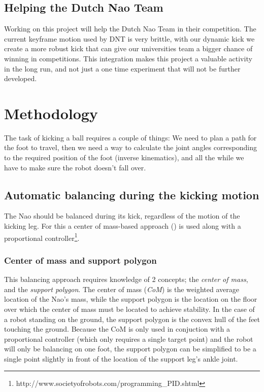 \documentclass[a4paper]{article}
\begin{document}
\subsection{Helping the Dutch Nao Team}
 Working on this project will help the Dutch Nao Team in their competition. The
current keyframe motion used by DNT is very brittle, with our dynamic kick we
create a
more robust kick that can give our universities team a bigger chance of
winning in competitions. 
This integration makes this project a valuable activity in the long run, and not
just a one time experiment that will not be further developed.

\section{Methodology}
The task of kicking a ball requires a couple of things: We need to plan a path
for the foot to travel, then we need a way to calculate the joint angles
corresponding to the required position of the foot (inverse kinematics), and all
the while we have to make sure the robot doesn't fall over.

\subsection{Automatic balancing during the kicking motion}
The Nao should be balanced during its kick, regardless of the motion of the
kicking leg. For this a center of mass-based approach (\cite{Xu2010}) is used
along with a proportional
controller\footnote{http://www.societyofrobots.com/programming\_PID.shtml}.

\subsubsection{Center of mass and support polygon}
This balancing approach requires knowledge of 2 concepts; the \emph{center of mass},
and the \emph{support polygon}. The center of mass (\emph{CoM}) is the weighted average
location of the Nao’s mass, while the support polygon is the location on the
floor over which the center of mass must be located to achieve stability. In the
case of a robot standing on the ground, the support polygon is the convex hull
of the feet touching the ground. Because the CoM is only used in conjuction with
a proportional controller (which only requires a single target point) and the
robot will only be balancing on one foot, the support polygon can be simplified
to be a single point slightly in front of the location of the support leg's ankle
joint.
\end{document}
